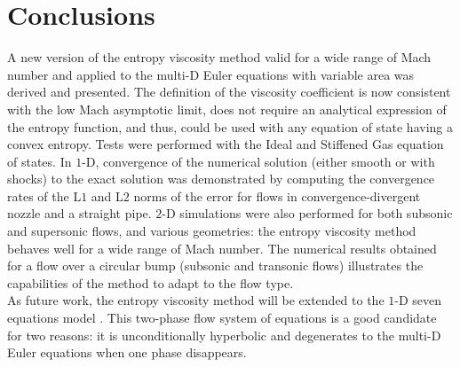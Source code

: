 \section{Conclusions} \label{sec:ccl}
A new version of the entropy viscosity method valid for a wide range of Mach number and applied to the multi-D Euler equations with variable area was derived and presented. The definition of the viscosity coefficient is now consistent with the low Mach asymptotic limit, does not require an analytical expression of the entropy function, and thus, could be used with any equation of state having a convex entropy. Tests were performed with the Ideal and Stiffened Gas equation of states. In $1$-D, convergence of the numerical solution (either smooth or with shocks) to the exact solution was demonstrated by computing the convergence rates of the L$1$ and L$2$ norms of the error for flows in convergence-divergent nozzle and a straight pipe. $2$-D simulations were also performed for both subsonic and supersonic flows, and various geometries: the entropy viscosity method behaves well for a wide range of Mach number. The numerical results obtained for a flow over a circular bump (subsonic and transonic flows) illustrates the capabilities of the method to adapt to the flow type. \\
As future work, the entropy viscosity method will be extended to the $1$-D seven equations model \cite{SEM}. This two-phase flow system of equations is a good candidate for two reasons: it is unconditionally hyperbolic and degenerates to the multi-D Euler equations when one phase disappears.